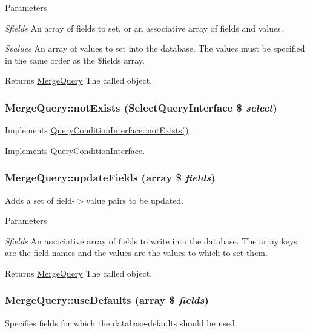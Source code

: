 \begin{DoxyParams}{Parameters}
\item[{\em \$fields}]An array of fields to set, or an associative array of fields and values. \item[{\em \$values}]An array of values to set into the database. The values must be specified in the same order as the \$fields array.\end{DoxyParams}
\begin{DoxyReturn}{Returns}
\hyperlink{classMergeQuery}{MergeQuery} The called object. 
\end{DoxyReturn}
\hypertarget{classMergeQuery_a3749f7ccb2e71b8ff1570161418cbf2b}{
\subsubsection[{notExists}]{\setlength{\rightskip}{0pt plus 5cm}MergeQuery::notExists ({\bf SelectQueryInterface} \$ {\em select})}}
\label{classMergeQuery_a3749f7ccb2e71b8ff1570161418cbf2b}
Implements \hyperlink{interfaceQueryConditionInterface_a8aae11796846850edbf8caa3a9d4afcd}{QueryConditionInterface::notExists()}. 

Implements \hyperlink{interfaceQueryConditionInterface_a8aae11796846850edbf8caa3a9d4afcd}{QueryConditionInterface}.\hypertarget{classMergeQuery_ad5b51b48eaec3821181cf8e6c09bf29e}{
\subsubsection[{updateFields}]{\setlength{\rightskip}{0pt plus 5cm}MergeQuery::updateFields (array \$ {\em fields})}}
\label{classMergeQuery_ad5b51b48eaec3821181cf8e6c09bf29e}
Adds a set of field-\/$>$value pairs to be updated.


\begin{DoxyParams}{Parameters}
\item[{\em \$fields}]An associative array of fields to write into the database. The array keys are the field names and the values are the values to which to set them.\end{DoxyParams}
\begin{DoxyReturn}{Returns}
\hyperlink{classMergeQuery}{MergeQuery} The called object. 
\end{DoxyReturn}
\hypertarget{classMergeQuery_a630cdd152352b1229cc712ec261139cf}{
\subsubsection[{useDefaults}]{\setlength{\rightskip}{0pt plus 5cm}MergeQuery::useDefaults (array \$ {\em fields})}}
\label{classMergeQuery_a630cdd152352b1229cc712ec261139cf}
Specifies fields for which the database-\/defaults should be used.


